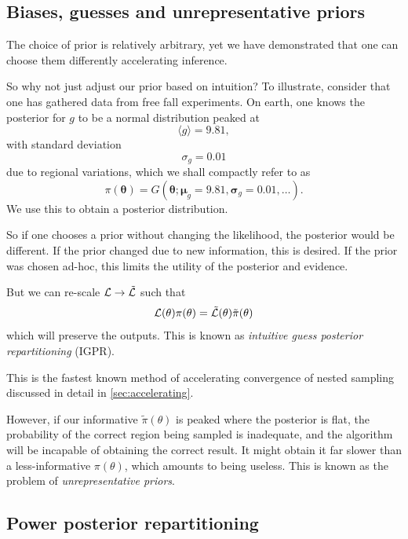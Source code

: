 \documentclass[usenatbib]{mnras}
\begin{document}
\subsection{Biases, guesses and unrepresentative
  priors\label{discussion-bias}}
The choice of prior is relatively arbitrary, yet we have
demonstrated that one can choose them differently accelerating
inference.

So why not just adjust our prior based on intuition?  To illustrate,
consider that one has gathered data from free fall experiments. On
earth, one knows the posterior for \(g\) to be a normal distribution
peaked at \[\langle g \rangle=9.81,\] with standard
deviation \[\sigma_{g} = 0.01\] due to regional variations, which we
shall compactly refer to as
\begin{equation*}
  \pi(\bm{\theta}) = G(\bm{\theta};\bm{\mu}_{g}=9.81, \bm{\sigma}_{g}=0.01, \ldots ).
\end{equation*}
We use this to obtain a posterior distribution.

So if one chooses a prior without changing the likelihood, the
posterior would be different. If the prior changed due to new
information, this is desired. If the prior was chosen ad-hoc, this
limits the utility of the posterior and evidence.

But we can re-scale ${\cal L} \rightarrow \tilde{\cal L}$ such that
\begin{equation}
  \label{eq:idea-repart}
{\cal L}(\theta)\pi(\theta)= \tilde{\cal L}(\theta) \tilde{\pi}(\theta)
\end{equation}
which will preserve the outputs.  This is known as \emph{intuitive guess posterior repartitioning} (IGPR).

This is the fastest known method of accelerating convergence of nested sampling discussed in detail in \cref{sec:accelerating}. 

However, if our informative $\tilde{\pi}(\theta)$ is peaked where the
posterior is flat, the probability of the correct region being sampled
is inadequate, and the algorithm will be incapable of obtaining the
correct result. It might obtain it far slower than a less-informative
$\pi(\theta)$, which amounts to being useless. This is known as the
problem of \emph{unrepresentative priors}.


\subsection{Power posterior repartitioning}\label{sec:org68fff63}
\end{document}
